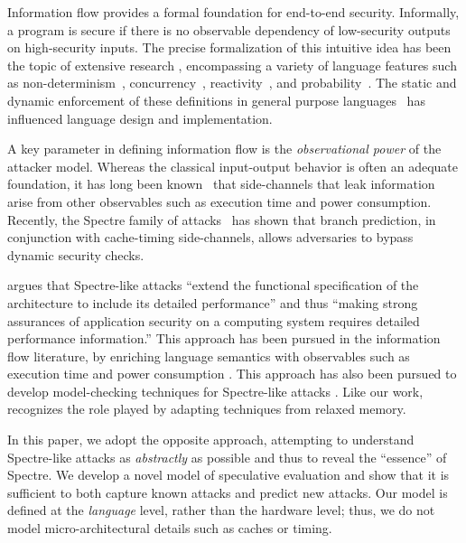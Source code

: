 Information flow provides a formal
foundation for end-to-end security.  Informally, a program is secure
if there is no observable dependency of low-security outputs on high-security inputs.
The precise formalization of this intuitive idea has been the topic of
extensive research \cite{Sabelfeld:2006:LIS:2312191.2314769}, encompassing a variety of language
features such as non-determinism~\cite{Wittbold1990InformationFI},
concurrency~\cite{Smith:1998:SIF:268946.268975}, reactivity~\cite{O'Neill:2006:ISI:1155442.1155677}, and
probability~\cite{Gray:1992:TMF:2699806.2699811}. The static and dynamic enforcement
of these definitions in general purpose languages~\cite{myers-popl99} has %
influenced language design and implementation.

A key parameter in defining information flow is the \emph{observational power} of the attacker model. Whereas the classical
input-output behavior is often an adequate foundation,
it has long been known~\cite{Lampson:1973:NCP:362375.362389,Biswas:2017:STC:3058791.3023872} that side-channels that leak
information arise from other observables such as execution time and
power consumption.
Recently, the Spectre family of attacks~\cite{DBLP:journals/corr/abs-1801-01203} has
shown that branch prediction, in conjunction with cache-timing side-channels,
allows adversaries to bypass dynamic security checks.

\citet{Chien:2018} argues that Spectre-like attacks ``extend the functional
specification of the architecture to include its detailed performance'' and
thus ``making strong assurances of application security on a computing system
requires detailed performance information.''
This approach has been pursued in the information flow literature, by
enriching language semantics with observables such as execution time and  power consumption
\cite{Zhang:2012:LCM:2345156.2254078,hyperflow}.   This approach
has also been pursued to develop model-checking techniques for Spectre-like
attacks \cite{DBLP:conf/micro/TrippelLM18}.  Like our work,
\cite{DBLP:conf/micro/TrippelLM18} recognizes the role played by adapting
techniques from relaxed memory.

In this paper, we adopt the opposite approach, attempting to understand
Spectre-like attacks as \emph{abstractly} as possible and thus to reveal the
``essence'' of Spectre.  We develop a novel model of speculative
evaluation and show that it is sufficient to both capture known attacks and
predict new attacks.  Our model is defined at the \emph{language} level,
rather than the hardware level; thus, we do not model micro-architectural
details such as caches or timing.

